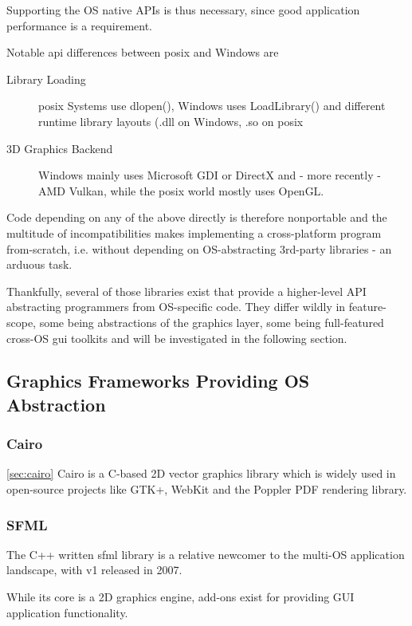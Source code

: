 Supporting the OS native APIs is thus necessary, since good application performance is a requirement.

Notable \gls{api} differences between \gls{posix} and Windows are
\begin{description}
	\item[Library Loading] \gls{posix} Systems use dlopen(), Windows uses LoadLibrary() and different runtime library layouts (.dll on Windows, .so on \gls{posix}
	\item[3D Graphics Backend] Windows mainly uses Microsoft GDI or DirectX and - more recently - AMD Vulkan, while the \gls{posix} world mostly uses OpenGL.
\end{description}

Code depending on any of the above directly is therefore nonportable and the multitude of incompatibilities makes implementing a cross-platform program from-scratch, i.e. without depending on OS-abstracting 3rd-party libraries - an arduous task.

Thankfully, several of those libraries exist that provide a higher-level API abstracting programmers from OS-specific code. They differ wildly in feature-scope, some being abstractions of the graphics layer, some being full-featured cross-OS \gls{gui} toolkits and will be investigated in the following section.

\subsection{Graphics Frameworks Providing OS Abstraction}

\subsubsection{Cairo}
\ref{sec:cairo}
Cairo is a C-based 2D vector graphics library which is widely used in open-source projects like GTK+, WebKit and the Poppler PDF rendering library.

\subsubsection{SFML}
The C++ written \gls{sfml} library is a relative newcomer to the multi-OS application landscape, with v1 released in 2007.

While its core is a 2D graphics engine, add-ons exist for providing GUI application functionality.  

